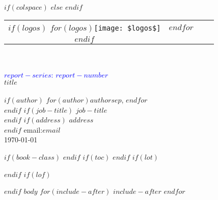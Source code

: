 \documentclass[$if(fontsize)$$fontsize$,$endif$$if(lang)$$lang$,$endif$$if(papersize)$$papersize$,$endif$$for(classoption)$$classoption$$sep$,$endfor$]{$documentclass$}
\begin{document}

\thispagestyle{empty}
\vspace*{30mm}
\begin{flushright}
\HRule\\[5mm]

$if(colspace)$
\setlength{\tabcolsep}{$colspace$}
$else$
\setlength{\tabcolsep}{12pt}
$endif$

\begin{tabular}{cccc}
$if(logos)$
$for(logos)$\texttt{[image: \$logos\$]} & $endfor$\\
$endif$
\end{tabular}\\[5mm]
\setlength{\tabcolsep}{6pt}

\huge
\textcolor{blue}{\sbf $report-series$: $report-number$}\\[6mm]

{\sbf $title$}\\
\Large
\vspace{2mm}{\sbf $subtitle$}\\[5mm]

\sf\normalsize
$if(author)$
$for(author)$$author$$sep$, $endfor$\\
$endif$
$if(job-title)$
$job-title$\\
$endif$
$if(address)$
$address$\\
$endif$
email:\;$email$\\[8mm]

\today\\
\HRule
\end{flushright}


\clearpage
$if(book-class)$
\frontmatter
$endif$
$if(toc)$
\pagestyle{plain}
\setcounter{page}{1}
\setcounter{tocdepth}{2}
\tableofcontents
\clearpage
$endif$
$if(lot)$
\listoftables
$endif$
$if(lof)$
\listoffigures
$endif$
$body$
$for(include-after)$
$include-after$
$endfor$
\end{document}
